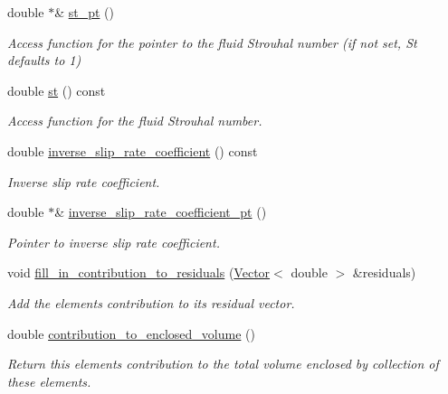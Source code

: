 \begin{DoxyCompactItemize}
double $\ast$\& \hyperlink{classoomph_1_1LinearisedAxisymPoroelasticBJS__FSIElement_a9b7727eac2aa2258eeebe923642dde68}{st\+\_\+pt} ()
\begin{DoxyCompactList}\small\item\em Access function for the pointer to the fluid Strouhal number (if not set, St defaults to 1) \end{DoxyCompactList}\item 
double \hyperlink{classoomph_1_1LinearisedAxisymPoroelasticBJS__FSIElement_a5dfd37623c3ea756028040a42db79b49}{st} () const
\begin{DoxyCompactList}\small\item\em Access function for the fluid Strouhal number. \end{DoxyCompactList}\item 
double \hyperlink{classoomph_1_1LinearisedAxisymPoroelasticBJS__FSIElement_a0ec031247ada81e71ba0173e33d98063}{inverse\+\_\+slip\+\_\+rate\+\_\+coefficient} () const
\begin{DoxyCompactList}\small\item\em Inverse slip rate coefficient. \end{DoxyCompactList}\item 
double $\ast$\& \hyperlink{classoomph_1_1LinearisedAxisymPoroelasticBJS__FSIElement_a8c13b99a9fb29ce9dcd9e03ca1fe393b}{inverse\+\_\+slip\+\_\+rate\+\_\+coefficient\+\_\+pt} ()
\begin{DoxyCompactList}\small\item\em Pointer to inverse slip rate coefficient. \end{DoxyCompactList}\item 
void \hyperlink{classoomph_1_1LinearisedAxisymPoroelasticBJS__FSIElement_ade3350a09dce17dfb6443d40455fe763}{fill\+\_\+in\+\_\+contribution\+\_\+to\+\_\+residuals} (\hyperlink{classoomph_1_1Vector}{Vector}$<$ double $>$ \&residuals)
\begin{DoxyCompactList}\small\item\em Add the element\textquotesingle{}s contribution to its residual vector. \end{DoxyCompactList}\item 
double \hyperlink{classoomph_1_1LinearisedAxisymPoroelasticBJS__FSIElement_a698c4c54f4e7419a3562792c0d935c55}{contribution\+\_\+to\+\_\+enclosed\+\_\+volume} ()
\begin{DoxyCompactList}\small\item\em Return this element\textquotesingle{}s contribution to the total volume enclosed by collection of these elements. \end{DoxyCompactList}\item 

\end{DoxyCompactItemize}
